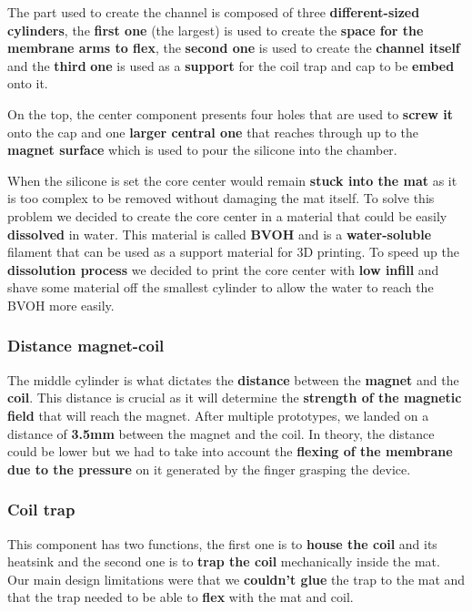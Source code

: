 The part used to create the channel is composed of three \textbf{different-sized cylinders}, the \textbf{first one} (the largest) is used to create the \textbf{space for the membrane arms to flex}, the \textbf{second one} is used to create the \textbf{channel itself} and the \textbf{third} \textbf{one} is used as a \textbf{support} for the coil trap and cap to be \textbf{embed} onto it.

On the top, the center component presents four holes that are used to \textbf{screw it} onto the cap and one \textbf{larger central one} that reaches through up to the \textbf{magnet surface} which is used to pour the silicone into the chamber.

When the silicone is set the core center would remain \textbf{stuck into the mat} as it is too complex to be removed without damaging the mat itself.
To solve this problem we decided to create the core center in a material that could be easily \textbf{dissolved} in water.
This material is called \textbf{BVOH} and is a \textbf{water-soluble} filament that can be used as a support material for 3D printing.
To speed up the \textbf{dissolution process} we decided to print the core center with \textbf{low infill} and shave some material off the smallest cylinder to allow the water to reach the BVOH more easily.

\subsubsection{Distance magnet-coil}
The middle cylinder is what dictates the \textbf{distance} between the \textbf{magnet} and the \textbf{coil}.
This distance is crucial as it will determine the \textbf{strength of the magnetic field} that will reach the magnet.
After multiple prototypes, we landed on a distance of \textbf{3.5mm} between the magnet and the coil.
In theory, the distance could be lower but we had to take into account the \textbf{flexing of the membrane due to the pressure} on it generated by the finger grasping the device.

\subsubsection{Coil trap}
This component has two functions, the first one is to \textbf{house the coil} and its heatsink and the second one is to \textbf{trap the coil} mechanically inside the mat.
Our main design limitations were that we \textbf{couldn't glue} the trap to the mat and that the trap needed to be able to \textbf{flex} with the mat and coil.

